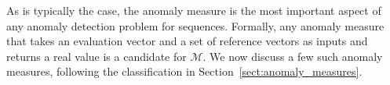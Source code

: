 %
%
%
%
%

As is typically the case, the anomaly measure is the most important aspect of any anomaly detection problem for sequences. Formally, any anomaly measure that takes an evaluation vector and a set of reference vectors as inputs and returns a real value is a candidate for $\mathcal{M}$. We now discuss a few such anomaly measures, following the classification in Section~\ref{sect:anomaly_measures}.

